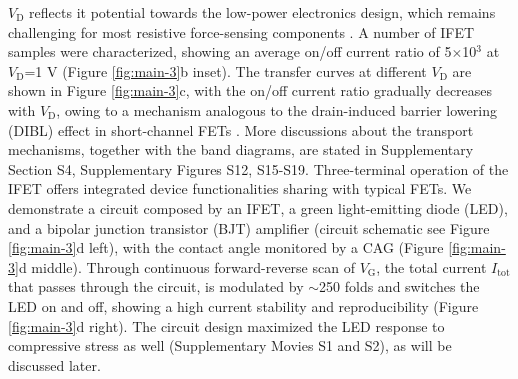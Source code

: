 \documentclass[journal=nalefd,manuscript=letter,email=true,hyperref=true,keywords=true]{achemso}
\begin{document}
\(V_{\mathrm{D}}\) reflects it potential towards the low-power
electronics design, which remains challenging for most resistive
force-sensing components \cite{Pan_2014,Pang_2012}. A number of IFET
samples were characterized, showing an average on/off current ratio
of 5\(\times\)10\(^{\text{3}}\) at \(V_{\mathrm{D}}\)=1 V (Figure  \ref{fig:main-3}b
inset). The transfer curves at different \(V_{\mathrm{D}}\) are shown
in Figure \ref{fig:main-3}c, with the on/off current ratio gradually
decreases with \(V_{\mathrm{D}}\), owing to a mechanism analogous to
the drain-induced barrier lowering (DIBL) effect in short-channel
FETs \cite{Lundstrom_2003}. More discussions about the transport
mechanisms, together with the band diagrams, are stated in
Supplementary Section S4, Supplementary Figures S12,
S15-S19. Three-terminal operation of the IFET offers integrated
device functionalities sharing with typical FETs. We demonstrate a
circuit composed by an IFET, a green light-emitting diode (LED), and
a bipolar junction transistor (BJT) amplifier (circuit schematic see
Figure \ref{fig:main-3}d left), with the contact angle monitored by a
CAG (Figure \ref{fig:main-3}d middle). Through continuous
forward-reverse scan of \(V_{\mathrm{G}}\), the total current
\(I_{\mathrm{tot}}\) that passes through the circuit, is modulated by
\(\sim\)250 folds and switches the LED on and off, showing a high current
stability and reproducibility (Figure  \ref{fig:main-3}d right). The
circuit design maximized the LED response to compressive stress as
well (Supplementary Movies S1 and S2), as will be discussed later.
\end{document}
